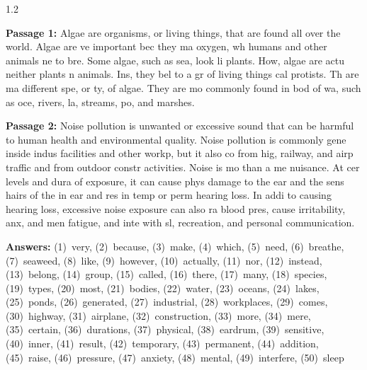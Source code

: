 \begin{spacing}{1.2}

\textbf{Passage 1:} Algae are organisms, or living things, that are found all over the world. Algae are ve important bec they ma oxygen, wh humans and other animals ne to bre. Some algae, such as sea, look li plants. How, algae are actu neither plants n animals. Ins, they bel to a gr of living things cal protists. Th are ma different spe, or ty, of algae. They are mo commonly found in bod of wa, such as oce, rivers, la, streams, po, and marshes.

\vspace{0.5 cm}

\textbf{Passage 2:} Noise pollution is unwanted or excessive sound that can be harmful to human health and environmental quality. Noise pollution is commonly gene inside indus facilities and other workp, but it also co from hig, railway, and airp traffic and from outdoor constr activities. Noise is mo than a me nuisance. At cer levels and dura of exposure, it can cause phys damage to the ear and the sens hairs of the in ear and res in temp or perm hearing loss. In addi to causing hearing loss, excessive noise exposure can also ra blood pres, cause irritability, anx, and men fatigue, and inte with sl, recreation, and personal communication.

\end{spacing}

\vspace{0.5 cm}

\textbf{Answers:} (1)~very, (2)~because, (3)~make, (4)~which, (5)~need, (6)~breathe, (7)~seaweed, (8)~like, (9)~however, (10)~actually, (11)~nor, (12)~instead, (13)~belong, (14)~group, (15)~called, (16)~there, (17)~many, (18)~species, (19)~types, (20)~most, (21)~bodies, (22)~water, (23)~oceans, (24)~lakes, (25)~ponds, (26)~generated, (27)~industrial, (28)~workplaces, (29)~comes, (30)~highway, (31)~airplane, (32)~construction, (33)~more, (34)~mere, (35)~certain, (36)~durations, (37)~physical, (38)~eardrum, (39)~sensitive, (40)~inner, (41)~result, (42)~temporary, (43)~permanent, (44)~addition, (45)~raise, (46)~pressure, (47)~anxiety, (48)~mental, (49)~interfere, (50)~sleep

